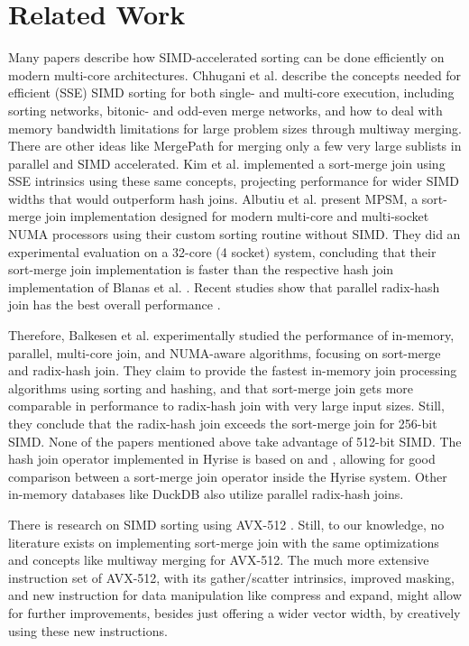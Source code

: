 \section{Related Work}
\label{sec:related-work}


Many papers describe how SIMD-accelerated sorting can be done efficiently on modern multi-core architectures. 
Chhugani et al. \cite{10.14778/1454159.1454171} describe the concepts 
needed for efficient (SSE) SIMD sorting for both single- and multi-core execution, including sorting
networks, bitonic- and odd-even merge networks, and how to deal with memory bandwidth limitations 
for large problem sizes through multiway merging. There are other ideas like MergePath \cite{MergePath}
for merging only a few very large sublists in parallel and SIMD accelerated.
Kim et al. \cite{10.14778/1687553.1687564} implemented a sort-merge join using SSE intrinsics using these same 
concepts, projecting performance for wider SIMD widths that would outperform hash joins. Albutiu 
et al. \cite{MPSM} present MPSM, a sort-merge join implementation designed for modern multi-core and
multi-socket NUMA processors using their custom sorting routine without SIMD. They did an
experimental evaluation on a 32-core (4 socket) system, concluding that their sort-merge join
implementation is faster than the respective hash join implementation of Blanas et al. \cite{10.1145/1989323.1989328}. 
Recent studies show that parallel radix-hash join has the best overall performance \cite{6544839}.

Therefore,
Balkesen et al. \cite{Balkesen} experimentally studied the performance of in-memory, parallel,
multi-core join, and NUMA-aware algorithms, focusing on sort-merge and radix-hash join.
They claim to provide the fastest in-memory join processing algorithms using sorting and hashing,
and that sort-merge join gets more comparable in performance to radix-hash join with very large 
input sizes. Still, they conclude that the radix-hash join exceeds the sort-merge join for 256-bit
SIMD. None of the papers mentioned above take advantage of 512-bit SIMD. The hash join operator
implemented in Hyrise is based on \cite{6544839} and \cite{Balkesen}, allowing for good comparison
between a sort-merge join operator inside the Hyrise system. Other in-memory databases like DuckDB 
also utilize parallel radix-hash joins.

There is research on SIMD
sorting using AVX-512 \cite{Watkins, 8855628}. Still, to our knowledge, no literature 
exists on implementing sort-merge join with the same optimizations and concepts like
multiway merging for AVX-512. The much more extensive instruction set of AVX-512, with its gather/scatter intrinsics, improved
masking, and new instruction for data manipulation like compress and expand, might allow for
further improvements, besides just offering a wider vector width, by creatively using these new
instructions.
